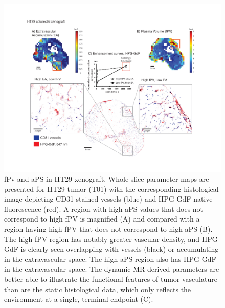 \begin{figure}[htbp]   
 \begin{center}  
 \includegraphics[width=\textwidth]{hpg/hpg-paper1-images/hpg_fig5-ht29fpv.pdf}
 \caption{fPv and aPS in HT29 xenograft. 
 Whole-slice parameter maps are presented for HT29 tumor (T01) with the corresponding histological image depicting CD31 stained vessels (blue) and HPG-GdF native fluorescence (red). 
 A region with high aPS values that does not correspond to high fPV is magnified (A) and compared with a region having high fPV that does not correspond to high aPS (B). 
 The high fPV region has notably greater vascular density, and HPG-GdF is clearly seen overlapping with vessels (black) or accumulating in the extravascular space. 
 The high aPS region also has HPG-GdF in the extravascular space. 
 The dynamic MR-derived parameters are better able to illustrate the functional features of tumor vasculature than are the static histological data, which only reflects the environment at a single, terminal endpoint (C).}  
 \label{hpgpaper1:fig5}  
 \end{center}
\end{figure}

